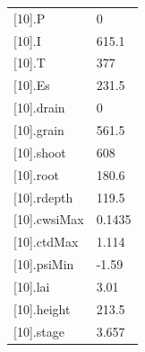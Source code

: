 {\begin{longtable}{p{}p{}}
{}[10].P & 0\\
{}[10].I & 615.1\\
{}[10].T & 377\\
{}[10].Es & 231.5\\
{}[10].drain & 0\\
{}[10].grain & 561.5\\
{}[10].shoot & 608\\
{}[10].root & 180.6\\
{}[10].rdepth & 119.5\\
{}[10].cwsiMax & 0.1435\\
{}[10].ctdMax & 1.114\\
{}[10].psiMin & -1.59\\
{}[10].lai & 3.01\\
{}[10].height & 213.5\\
{}[10].stage & 3.657\\
\bottomrule\end{longtable}}

